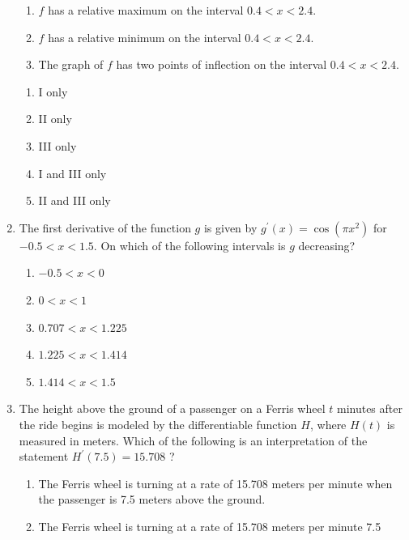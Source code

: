 \documentclass{article}
\begin{document}
\begin{enumerate}
\begin{minipage}[t]{\linewidth}
\begin{enumerate}[label=\Roman*.,leftmargin=1.0in]
  \item $f$ has a relative maximum on the interval $0.4<x<2.4$.
  \item $f$ has a relative minimum on the interval $0.4<x<2.4$.
  \item The graph of $f$ has two points of inflection on the interval $0.4<x<2.4$.
\end{enumerate}
\vspace{1em}
		\begin{enumerate}
		\itemsep1em
			\item I only
			\item II only
			\item III only
			\item I and III only
			\item II and III only
		\end{enumerate}
	\end{minipage}
	\item
	\begin{minipage}[t]{\linewidth}
		The first derivative of the function \(g\) is given by
\(g^{\prime}(x)=\cos \left(\pi x^{2}\right)\) for \(-0.5<x<1.5\). On
which of the following intervals is \(g\) decreasing?
\vspace{1em}
		\begin{enumerate}
		\itemsep1em
			\item \(-0.5<x<0\)
			\item \(0<x<1\)
			\item \(0.707<x<1.225\)
			\item \(1.225<x<1.414\)
			\item \(1.414<x<1.5\)
		\end{enumerate}
	\end{minipage}
	\item
	\begin{minipage}[t]{\linewidth}
		The height above the ground of a passenger on a Ferris wheel \(t\)
minutes after the ride begins is modeled by the differentiable function
\(H\), where \(H(t)\) is measured in meters. Which of the following is
an interpretation of the statement \(H^{\prime}(7.5)=15.708\) ?
\vspace{1em}
		\begin{enumerate}
		\itemsep1em
			\item The Ferris wheel is turning at a rate of 15.708 meters per minute when
the passenger is 7.5 meters above the ground.
			\item The Ferris wheel is turning at a rate of 15.708 meters per minute 7.5

\end{enumerate}
\end{minipage}
\end{enumerate}
\end{document}
